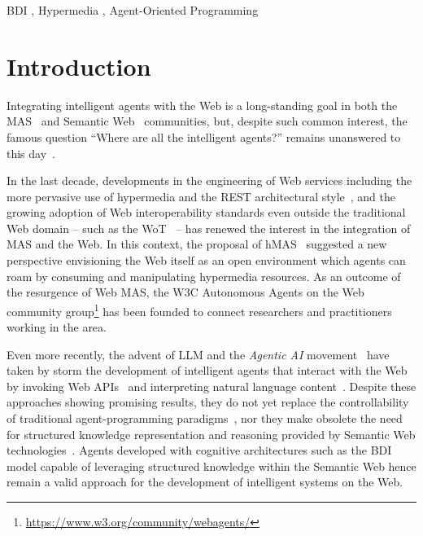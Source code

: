 \documentclass[
]{ceurart}
\begin{document}
\begin{keywords}
  BDI  \sep 
  Hypermedia \sep 
  Agent-Oriented Programming
\end{keywords}

\maketitle

\section{Introduction}

Integrating intelligent agents with the Web is a long-standing goal
in both the \ac{MAS}~\cite{DBLP:conf/edoc/ShafiqDF06}
and Semantic Web~\cite{lassila2001semantic} communities, but,
despite such common interest, 
the famous question ``Where are all the intelligent agents?'' remains unanswered to this day~\cite{hendlerb2007expert}.

In the last decade, developments in the engineering of Web services including
the more pervasive use of hypermedia and the \ac{REST} architectural style~\cite{DBLP:conf/icse/FieldingT00},
and the growing adoption of Web interoperability standards even outside the traditional Web domain
-- such as the \ac{WoT}~\cite{wotarch} --
has renewed the interest in the integration of \ac{MAS} and the Web.
%
In this context, 
the proposal of \ac{hMAS}~\cite{DBLP:conf/atal/CiorteaMGBRZ19} suggested a new perspective
envisioning the Web itself as an open environment
which agents can roam by consuming and manipulating hypermedia resources.
%
As an outcome of the resurgence of Web \ac{MAS},
the \ac{W3C} Autonomous Agents on the Web community group\footnote{\url{https://www.w3.org/community/webagents/}}
has been founded to connect researchers and practitioners working in the area. 

Even more recently, the advent of \ac{LLM} and the \emph{Agentic AI} movement~\cite{acharya2025access} 
have taken by storm the development of intelligent agents that interact with the Web by invoking Web APIs~\missingref{} and interpreting natural language content~\missingref{}.
%
Despite these approaches showing promising results,
they do not yet replace the controllability of traditional agent-programming paradigms~\missingref{},
nor they make obsolete the need for structured knowledge representation and reasoning provided by Semantic Web technologies~\cite{pan2024tkde}.
%
Agents developed with cognitive architectures such as the \ac{BDI} model
capable of leveraging structured knowledge within the Semantic Web 
hence remain a valid approach for the development of intelligent systems on the Web.
\end{document}
